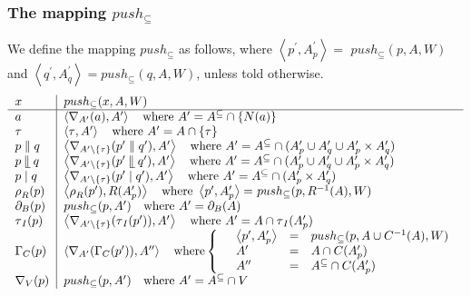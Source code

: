 \documentclass{article}
\begin{document}
\newpage

\subsubsection{The mapping $push_{\subseteq }$}

We define the mapping $push_{\subseteq }$ as follows, where $\left\langle
p^{\prime },A_{p}^{\prime }\right\rangle =$ $push_{\subseteq }(p,A,W)$ and $%
\left\langle q^{\prime },A_{q}^{\prime }\right\rangle =push_{\subseteq
}(q,A,W)$, unless told otherwise.%
\[
\begin{tabular}{l|l}
$x$ & $push_{\subseteq }(x,A,W)$ \\ \hline
$a$ & $\left\langle \nabla _{A^{\prime }}(a),A^{\prime }\right\rangle \text{
where }A^{\prime }=A^{\subseteq }\cap \{N(a)\}$ \\ 
$\tau $ & $\left\langle \tau ,A^{\prime }\right\rangle \text{ where }%
A^{\prime }=A\cap \{\tau \}$ \\ 
$p\parallel q$ & $\left\langle \nabla _{A^{\prime }\setminus \{\tau
\}}(p^{\prime }\parallel q^{\prime }),A^{\prime }\right\rangle \text{ where }%
A^{\prime }=A^{\subseteq }\cap (A_{p}^{\prime }\cup A_{q}^{\prime }\cup
A_{p}^{\prime }\times A_{q}^{\prime })$ \\ 
$p\mathbin{\mathrel{\llfloor}}q$ & $\left\langle \nabla _{A^{\prime
}\setminus \{\tau \}}(p^{\prime }\mathbin{\mathrel{\llfloor}}q^{\prime
}),A^{\prime }\right\rangle \text{ where }A^{\prime }=A^{\subseteq }\cap
(A_{p}^{\prime }\cup A_{q}^{\prime }\cup A_{p}^{\prime }\times A_{q}^{\prime
})$ \\ 
$p\mid q$ & $\left\langle \nabla _{A^{\prime }\setminus \{\tau \}}(p^{\prime
}\mid q^{\prime }),A^{\prime }\right\rangle \text{ where }A^{\prime
}=A^{\subseteq }\cap (A_{p}^{\prime }\times A_{q}^{\prime })$ \\ 
$\rho _{R}(p)$ & $\left\langle \rho _{R}(p^{\prime }),R(A_{p}^{\prime
})\right\rangle \text{ where }\left\langle p^{\prime },A_{p}^{\prime
}\right\rangle =$ $push_{\subseteq }(p,R^{-1}(A),W)$ \\ 
$\partial _{B}(p)$ & $push_{\subseteq }(p,A^{\prime })\text{ where }%
A^{\prime }=\partial _{B}(A)$ \\ 
$\tau _{I}(p)$ & $\left\langle \nabla _{A^{\prime }\setminus \{\tau \}}(\tau
_{I}(p^{\prime })),A^{\prime }\right\rangle \text{ where }A^{\prime }=A\cap
\tau _{I}(A_{p}^{\prime })\text{ }$ \\ 
$\Gamma _{C}(p)$ & $\left\langle \nabla _{A^{\prime }}(\Gamma _{C}(p^{\prime
})),A^{\prime \prime }\right\rangle \text{ where}\left\{ \text{ }%
\begin{array}{lll}
\left\langle p^{\prime },A_{p}^{\prime }\right\rangle & = & push_{\subseteq
}(p,A\cup C^{-1}(A),W) \\ 
A^{\prime } & = & A\cap C(A_{p}^{\prime }) \\ 
A^{\prime \prime } & = & A^{\subseteq }\cap C(A_{p}^{\prime })%
\end{array}%
\right. $ \\ 
$\nabla _{V}(p)$ & $push_{\subseteq }(p,A^{\prime })\text{ where }A^{\prime
}=A^{\subseteq }\cap V$%
\end{tabular}%
\]
\end{document}
